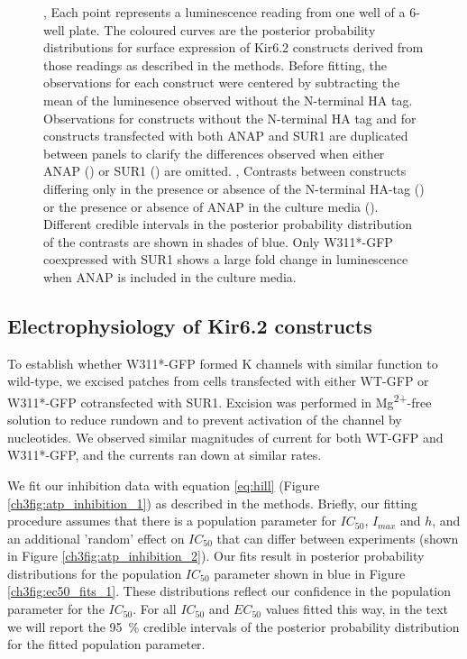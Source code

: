\begin{figure}[hbtp]
\begin{subfigure}[t]{0.45\textwidth}
	\end{subfigure}
	\caption[ANAP construct surface expression assay]{
	,  Each point represents a luminescence reading from one well of a 6-well plate.
	The coloured curves are the posterior probability distributions for surface expression of Kir6.2 constructs derived from those readings as described in the methods.
	Before fitting, the observations for each construct were centered by subtracting the mean of the luminesence observed without the N-terminal HA tag.
	Observations for constructs without the N-terminal HA tag and for constructs transfected with both ANAP and SUR1 are duplicated between panels to clarify the differences observed when either ANAP () or SUR1 () are omitted.
	,  Contrasts between constructs differing only in the presence or absence of the N-terminal HA-tag () or the presence or absence of ANAP in the culture media ().
	Different credible intervals in the posterior probability distribution of the contrasts are shown in shades of blue.
	Only W311*-GFP coexpressed with SUR1 shows a large fold change in luminescence when ANAP is included in the culture media.
	}
\end{figure}

\subsection{Electrophysiology of Kir6.2 constructs}

To establish whether W311*-GFP formed K\ATP{} channels with similar function to wild-type, we excised patches from cells transfected with either WT-GFP or W311*-GFP cotransfected with SUR1.
Excision was performed in Mg\textsuperscript{2+}-free solution to reduce rundown and to prevent activation of the channel by nucleotides.
We observed similar magnitudes of current for both WT-GFP and W311*-GFP, and the currents ran down at similar rates.

We fit our inhibition data with equation \ref{eq:hill} (Figure \ref{ch3fig:atp_inhibition_1}) as described in the methods.
Briefly, our fitting procedure assumes that there is a population parameter for $IC_{50}$, $I_{max}$ and $h$, and an additional 'random' effect on $IC_{50}$ that can differ between experiments (shown in Figure \ref{ch3fig:atp_inhibition_2}).
Our fits result in posterior probability distributions for the population $IC_{50}$ parameter shown in blue in Figure \ref{ch3fig:ec50_fits_1}.
These distributions reflect our confidence in the population parameter for the $IC_{50}$.
For all $IC_50$ and $EC_{50}$ values fitted this way, in the text we will report the \SI{95}{\percent} credible intervals of the posterior probability distribution for the fitted population parameter.


